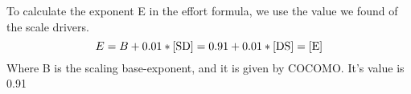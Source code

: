 To calculate the exponent E in the effort formula, we use the value we found of the scale drivers.
\begin{equation}
    E = B + 0.01 * \ref{SD} = 0.91 + 0.01 * \ref{DS} = \manuallabel{E}{1.066}\ref{E}
\end{equation}
Where B is the scaling base-exponent, and it is given by COCOMO. It's value is 0.91

